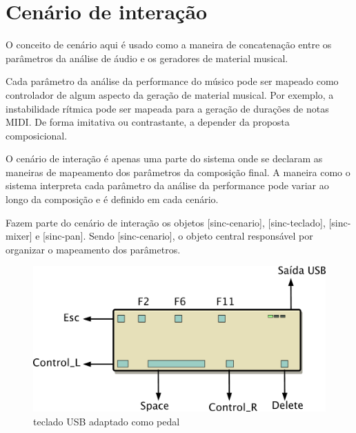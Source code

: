 \documentclass[draft]{ppgmus}
\begin{document}





\section{Cenário de interação}


O conceito de cenário aqui é usado como a maneira de concatenação
entre os parâmetros da análise de áudio e os geradores de material
musical.


Cada parâmetro da análise da performance do músico pode ser mapeado como controlador
de algum aspecto da geração de material musical. Por exemplo,
a instabilidade rítmica pode ser mapeada para a geração de durações
de notas MIDI. De forma imitativa ou contrastante, a depender da
proposta composicional.

O cenário de interação é apenas uma parte do sistema onde se declaram
as maneiras de mapeamento dos parâmetros da composição final. A maneira
como o sistema interpreta cada parâmetro da análise da performance pode
variar ao longo da composição e é definido em cada cenário.


Fazem parte do cenário de interação os objetos [sinc-cenario], [sinc-teclado],
[sinc-mixer] e [sinc-pan]. Sendo [sinc-cenario], o objeto central responsável
por organizar o mapeamento dos parâmetros.

\begin{figure}
\includegraphics[scale=.4]{teclado}
\caption{teclado USB adaptado como pedal}
\label{teclado}
\end{figure}
\end{document}
